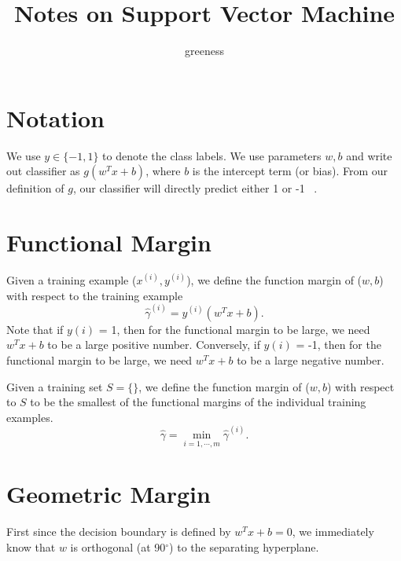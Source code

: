 \documentclass{article}  %
\begin{document}
\title{Notes on Support Vector Machine}
\author{greeness}


\maketitle

\section{Notation}

We use $y\in\{-1,1\}$ to denote the class labels. We use parameters $w,b$ and write out classifier as 
$g(w^Tx+b)$, where $b$ is the intercept term (or bias).  From our definition of $g$, our classifier will directly predict either 1 or -1 ~\cite{ng-lecture}.

\section{Functional Margin}

Given a training example ($x^{(i)}, y^{(i)}$), we define the function margin of ($w,b$) with respect to the training example
\[
\hat \gamma ^{(i)} = y^{(i)}(w^Tx + b).
\]
Note that if $y{(i)}$ = 1, then for the functional margin to be large, we need $w^Tx+b$ to be a large positive number. Conversely, if $y{(i)}$ = -1, then for the functional margin to be large, we need $w^Tx+b$ to be a large negative number. 

Given a training set $S = \{ \}$, we define the function margin of ($w,b$) with respect to $S$ to be the smallest of the functional margins of the individual training examples. 
\[
\hat \gamma = \min_{i=1,\cdots, m} \hat \gamma ^{(i)}.
\]

\section{Geometric Margin}
First since the decision boundary is defined by $w^Tx+b=0$, we immediately know that $w$ is orthogonal (at 90$^\circ$) to the separating hyperplane. 
\end{document}
